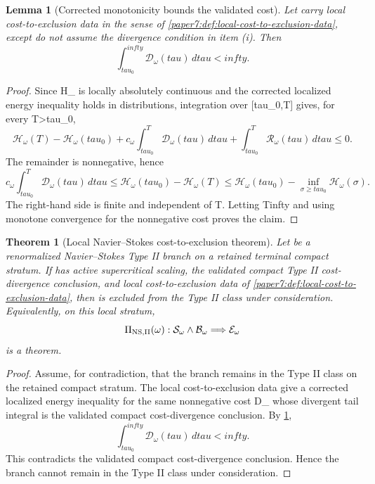 \documentclass[11pt]{amsart}
\def\({}%
\def\){}%
\def\tau{tau}%
\def\infty{infty}%
\theoremstyle{plain}
\newtheorem{theorem}{Theorem}[section]
\newtheorem{lemma}[lemma]{Lemma}
\theoremstyle{definition}
\theoremstyle{remark}
\begin{document}
\begin{lemma}[Corrected monotonicity bounds the validated cost]
\label{paper7:lem:corrected-monotonicity-bounds-cost}
Let \(\omega\) carry local cost-to-exclusion data in the sense of
\cref{paper7:def:local-cost-to-exclusion-data}, except do not assume the
divergence condition in item \textup{(i)}.  Then
\[
  \int_{\tau_0}^{\infty}\mathcal D_\omega(\tau)\,d\tau<\infty .
\]
\end{lemma}

\begin{proof}
Since \(\mathcal H_\omega\) is locally absolutely continuous and the corrected
localized energy inequality holds in distributions, integration over
\([\tau_0,T]\) gives, for every \(T>\tau_0\),
\[
  \mathcal H_\omega(T)-\mathcal H_\omega(\tau_0)
  +c_\omega\int_{\tau_0}^{T}\mathcal D_\omega(\tau)\,d\tau
  +\int_{\tau_0}^{T}\mathcal R_\omega(\tau)\,d\tau
  \le0 .
\]
The remainder is nonnegative, hence
\[
  c_\omega\int_{\tau_0}^{T}\mathcal D_\omega(\tau)\,d\tau
  \le
  \mathcal H_\omega(\tau_0)-\mathcal H_\omega(T)
  \le
  \mathcal H_\omega(\tau_0)
  -\inf_{\sigma\ge\tau_0}\mathcal H_\omega(\sigma).
\]
The right-hand side is finite and independent of \(T\).  Letting
\(T\to\infty\) and using monotone convergence for the nonnegative cost proves
the claim.
\end{proof}

\begin{theorem}[Local Navier--Stokes cost-to-exclusion theorem]
\label{paper7:thm:local-cost-to-exclusion}
Let \(\omega\) be a renormalized Navier--Stokes Type II branch on a retained
terminal compact stratum.  If \(\omega\) has active supercritical scaling, the
validated compact Type II cost-divergence conclusion, and local
cost-to-exclusion data of
\cref{paper7:def:local-cost-to-exclusion-data}, then \(\omega\) is excluded from
the Type II class under consideration.  Equivalently, on this local stratum,
\[
  \Pi_{\rm NS,II}(\omega):
  \mathcal S_\omega\wedge\mathcal B_\omega
  \Longrightarrow
  \mathcal E_\omega
\]
is a theorem.
\end{theorem}

\begin{proof}
Assume, for contradiction, that the branch remains in the Type II class on the
retained compact stratum.  The local cost-to-exclusion data give a corrected
localized energy inequality for the same nonnegative cost
\(\mathcal D_\omega\) whose divergent tail integral is the validated compact
cost-divergence conclusion.  By
\cref{paper7:lem:corrected-monotonicity-bounds-cost},
\[
  \int_{\tau_0}^{\infty}\mathcal D_\omega(\tau)\,d\tau<\infty .
\]
This contradicts the validated compact cost-divergence conclusion.  Hence the
branch cannot remain in the Type II class under consideration.
\end{proof}
\end{document}

